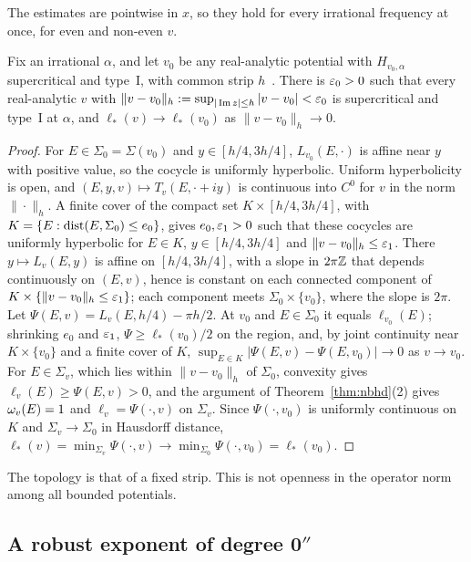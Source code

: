 The estimates are pointwise in $x$, so they hold for every irrational frequency at once, for even and non-even $v$.

\begin{proposition}[Openness]\label{prop:open}
Fix an irrational $\alpha$, and let $v_0$ be any real-analytic potential with $H_{v_0,\alpha}$ supercritical and type~I, with common strip $h$~\cite[Lemma~5.2]{DMuniv}. There is $\varepsilon_0>0$ such that every real-analytic $v$ with $\|v-v_0\|_h:=\sup_{|\operatorname{Im}z|\le h}|v-v_0|<\varepsilon_0$ is supercritical and type~I at $\alpha$, and $\ell_*(v)\to\ell_*(v_0)$ as $\|v-v_0\|_h\to0$.
\end{proposition}

\begin{proof}
For $E\in\Sigma_0=\Sigma(v_0)$ and $y\in[h/4,3h/4]$, $L_{v_0}(E,\cdot)$ is affine near $y$ with positive value, so the cocycle is uniformly hyperbolic. Uniform hyperbolicity is open, and $(E,y,v)\mapsto T_v(E,\cdot+iy)$ is continuous into $C^0$ for $v$ in the norm $\|\cdot\|_h$. A finite cover of the compact set $K\times[h/4,3h/4]$, with $K=\{E:\operatorname{dist}(E,\Sigma_0)\le e_0\}$, gives $e_0,\varepsilon_1>0$ such that these cocycles are uniformly hyperbolic for $E\in K$, $y\in[h/4,3h/4]$ and $\|v-v_0\|_h\le\varepsilon_1$. There $y\mapsto L_v(E,y)$ is affine on $[h/4,3h/4]$, with a slope in $2\pi\mathbb Z$ that depends continuously on $(E,v)$, hence is constant on each connected component of $K\times\{\|v-v_0\|_h\le\varepsilon_1\}$; each component meets $\Sigma_0\times\{v_0\}$, where the slope is $2\pi$. Let $\Psi(E,v)=L_v(E,h/4)-\pi h/2$. At $v_0$ and $E\in\Sigma_0$ it equals $\ell_{v_0}(E)$; shrinking $e_0$ and $\varepsilon_1$, $\Psi\ge\ell_*(v_0)/2$ on the region, and, by joint continuity near $K\times\{v_0\}$ and a finite cover of $K$, $\sup_{E\in K}|\Psi(E,v)-\Psi(E,v_0)|\to0$ as $v\to v_0$. For $E\in\Sigma_v$, which lies within $\|v-v_0\|_h$ of $\Sigma_0$, convexity gives $\ell_v(E)\ge\Psi(E,v)>0$, and the argument of Theorem~\ref{thm:nbhd}(2) gives $\omega_v(E)=1$ and $\ell_v=\Psi(\cdot,v)$ on $\Sigma_v$. Since $\Psi(\cdot,v_0)$ is uniformly continuous on $K$ and $\Sigma_v\to\Sigma_0$ in Hausdorff distance, $\ell_*(v)=\min_{\Sigma_v}\Psi(\cdot,v)\to\min_{\Sigma_0}\Psi(\cdot,v_0)=\ell_*(v_0)$.
\end{proof}

The topology is that of a fixed strip. This is not openness in the operator norm among all bounded potentials.

\subsection{A robust exponent of degree \texorpdfstring{$\mathbf 0''$}{0''}}

